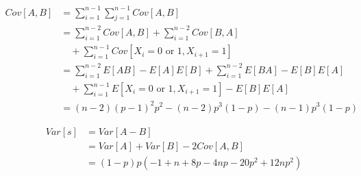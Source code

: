 \documentclass[12pt]{article}
\begin{document}
    \begin{equation*}
        \begin{split}
        Cov[A,B]& =\sum_{i=1}^{n-1}\sum_{j=1}^{n-1}Cov[A,B] \\
                & =\sum_{i=1}^{n-2}Cov[A,B]+\sum_{i=1}^{n-2}Cov[B,A] \\
                & \quad +\sum_{i=1}^{n-1}Cov[X_i=0\text{ or }1,X_{i+1}=1] \\
                & =\sum_{i=1}^{n-2}E[AB]-E[A]E[B]+\sum_{i=1}^{n-2}E[BA]-
                  E[B]E[A] \\
                & \quad +\sum_{i=1}^{n-1}E[X_i=0\text{ or }1,X_{i+1}=1]-
                  E[B]E[A] \\
                & =(n-2)(p-1)^2p^2-(n-2)p^3(1-p)-(n-1)p^3(1-p)
        \end{split}
    \end{equation*}

    \begin{equation*}
        \begin{split}
        Var[s]& =Var[A-B] \\
                    & =Var[A]+Var[B]-2Cov[A,B] \\
                    & =(1-p)p(-1+n+8p-4np-20p^2+12np^2)
        \end{split}
    \end{equation*}
\end{document}
